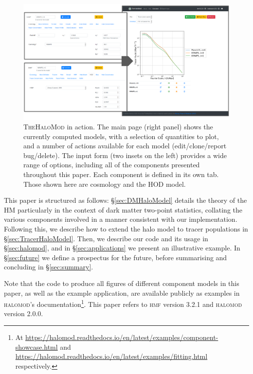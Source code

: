 \documentclass[5p,aas_macros]{elsarticle}
\newcommand{\halomod}{\textsc{halomod}}
\begin{document}
\begin{figure}
    \centering
    \includegraphics[width=\linewidth]{figures/thehalomod_app_schematic.pdf} 
    \caption{\textsc{TheHaloMod} in action. The main page (right panel) shows the currently computed models, with a selection of quantities to plot, and a number of actions available for each model (edit/clone/report bug/delete). The input form (two insets on the left) provides a wide range of options, including all of the components presented throughout this paper. Each component is defined in its own tab. Those shown here are cosmology and the HOD model.} \label{fig:webpage-image}
\end{figure}

This paper is structured as follows: \S\ref{sec:DMHaloModel} details the theory of the HM particularly in the context of dark matter two-point statistics, collating the various components involved in a manner consistent with our implementation. Following this, we describe how to extend the halo model to tracer populations in \S\ref{sec:TracerHaloModel}. Then, we describe our code and its usage in  \S\ref{sec:halomod}, and in \S\ref{sec:applications} we present an illustrative example. In \S\ref{sec:future} we define a prospectus for the future, before summarising and concluding in \S\ref{sec:summary}.

Note that the code to produce all figures of different component models in this paper, as well as the example application, are available publicly as examples in \halomod's documentation\footnote{At \url{https://halomod.readthedocs.io/en/latest/examples/component-showcase.html} and \url{https://halomod.readthedocs.io/en/latest/examples/fitting.html} respectively.}. This paper refers to \textsc{hmf} version 3.2.1 and \textsc{halomod} version 2.0.0.
\end{document}

